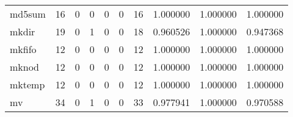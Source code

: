 \begin{longtable}{lrrrrrrrrr}
md5sum    &                                      16 &                                                  0 &                                                  0 &                                                  0 &                                                  0 &                                                 16 &                                           1.000000 &                               1.000000 &                             1.000000 \\
mkdir     &                                      19 &                                                  0 &                                                  1 &                                                  0 &                                                  0 &                                                 18 &                                           0.960526 &                               1.000000 &                             0.947368 \\
mkfifo    &                                      12 &                                                  0 &                                                  0 &                                                  0 &                                                  0 &                                                 12 &                                           1.000000 &                               1.000000 &                             1.000000 \\
mknod     &                                      12 &                                                  0 &                                                  0 &                                                  0 &                                                  0 &                                                 12 &                                           1.000000 &                               1.000000 &                             1.000000 \\
mktemp    &                                      12 &                                                  0 &                                                  0 &                                                  0 &                                                  0 &                                                 12 &                                           1.000000 &                               1.000000 &                             1.000000 \\
mv        &                                      34 &                                                  0 &                                                  1 &                                                  0 &                                                  0 &                                                 33 &                                           0.977941 &                               1.000000 &                             0.970588 \\

\end{longtable}

